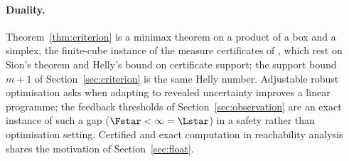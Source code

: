 \paragraph{Duality.}
Theorem~\ref{thm:criterion} is a minimax theorem on a product of a box and a simplex, the finite-cube instance of the measure certificates of \cite{Abaee2026minimax}, which rest on Sion's theorem and Helly's bound on certificate support; the support bound $m+1$ of Section~\ref{sec:criterion} is the same Helly number. Adjustable robust optimisation \cite{WeiZhang2024} asks when adapting to revealed uncertainty improves a linear programme; the feedback thresholds of Section~\ref{sec:observation} are an exact instance of such a gap ($\Fstar<\infty=\Lstar$) in a safety rather than optimisation setting. Certified and exact computation in reachability analysis \cite{Althoff2020,Geretti2020} shares the motivation of Section~\ref{sec:float}.

